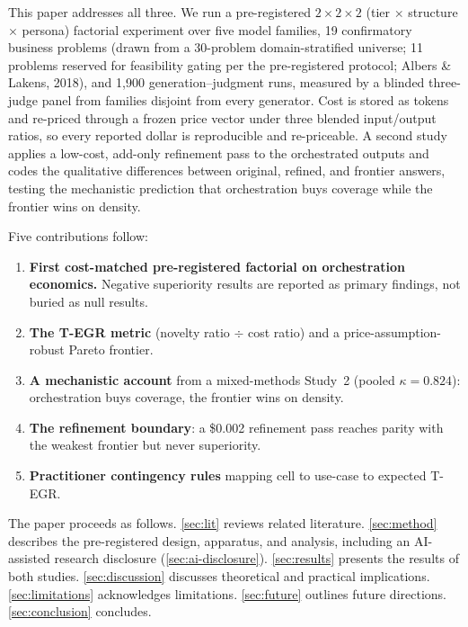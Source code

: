 \documentclass[12pt,a4paper]{article}
\begin{document}
This paper addresses all three. We run a pre-registered $2 \times 2 \times 2$
(tier $\times$ structure $\times$ persona) factorial experiment over five model
families, 19 confirmatory business problems (drawn from a 30-problem
domain-stratified universe; 11 problems reserved for feasibility gating
per the pre-registered protocol; Albers \& Lakens, 2018), and 1{,}900
generation--judgment runs, measured by a blinded three-judge panel from
families disjoint from every generator. Cost is stored as tokens and re-priced
through a frozen price vector under three blended input/output ratios, so every
reported dollar is reproducible and re-priceable. A second study applies a
low-cost, add-only refinement pass to the orchestrated outputs and codes the
qualitative differences between original, refined, and frontier answers,
testing the mechanistic prediction that orchestration buys coverage while the
frontier wins on density.

Five contributions follow:
\begin{enumerate}[leftmargin=*,nosep]
  \item \textbf{First cost-matched pre-registered factorial on orchestration
        economics.} Negative superiority results are reported as primary
        findings, not buried as null results.
  \item \textbf{The T-EGR metric} (novelty ratio $\div$ cost ratio) and a
        price-assumption-robust Pareto frontier.
  \item \textbf{A mechanistic account} from a mixed-methods Study~2 (pooled
        $\kappa = 0.824$): orchestration buys coverage, the frontier wins on
        density.
  \item \textbf{The refinement boundary}: a \$0.002 refinement pass reaches
        parity with the weakest frontier but never superiority.
  \item \textbf{Practitioner contingency rules} mapping cell to use-case to
        expected T-EGR.
\end{enumerate}

The paper proceeds as follows. \cref{sec:lit} reviews related literature.
\cref{sec:method} describes the pre-registered design, apparatus, and analysis,
including an AI-assisted research disclosure (\cref{sec:ai-disclosure}).
\cref{sec:results} presents the results of both studies. \cref{sec:discussion}
discusses theoretical and practical implications. \cref{sec:limitations}
acknowledges limitations. \cref{sec:future} outlines future directions.
\cref{sec:conclusion} concludes.
\end{document}
